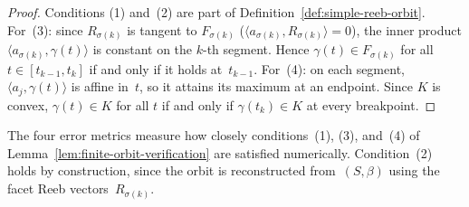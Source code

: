 \begin{proof}
Conditions (1) and~(2) are part of
Definition~\ref{def:simple-reeb-orbit}.
For~(3): since $R_{\sigma(k)}$ is tangent to $F_{\sigma(k)}$
($\langle a_{\sigma(k)}, R_{\sigma(k)} \rangle = 0$),
the inner product
$\langle a_{\sigma(k)}, \gamma(t) \rangle$ is constant on the $k$-th
segment. Hence $\gamma(t) \in F_{\sigma(k)}$ for all
$t \in [t_{k-1}, t_k]$ if and only if it holds at~$t_{k-1}$.
For~(4): on each segment, $\langle a_j, \gamma(t) \rangle$ is
affine in~$t$, so it attains its maximum at an endpoint. Since $K$ is
convex, $\gamma(t) \in K$ for all $t$ if and only if
$\gamma(t_k) \in K$ at every breakpoint.
\end{proof}

The four error metrics measure how closely conditions~(1), (3),
and~(4) of Lemma~\ref{lem:finite-orbit-verification} are satisfied
numerically. Condition~(2) holds by construction, since the orbit is
reconstructed from~$(S, \beta)$ using the facet Reeb
vectors~$R_{\sigma(k)}$.
